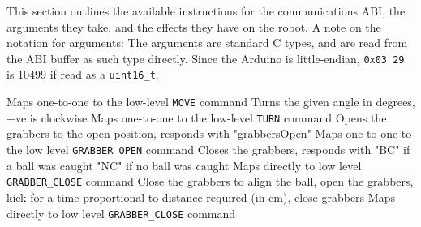 This section outlines the available instructions for the communications ABI, the arguments they take, and the effects they have on the robot.
A note on the notation for arguments: The arguments are standard C types, and are read from the ABI buffer as such type directly. 
Since the Arduino is little-endian, \texttt{0x03 29} is 10499 if read as a \texttt{uint16\_t}.

    {Maps one-to-one to the low-level \texttt{MOVE} command}
    {Turns the given angle in degrees, +ve is clockwise}
    {Maps one-to-one to the low-level \texttt{TURN} command}
    {Opens the grabbers to the open position, responds with "grabbersOpen"}
    {Maps one-to-one to the low level \texttt{GRABBER\_OPEN} command}
    {Closes the grabbers, responds with "BC" if a ball was caught "NC" if no ball was caught}
    {Maps directly to low level \texttt{GRABBER\_CLOSE} command}
    {Close the grabbers to align the ball, open the grabbers, kick for a time proportional to distance required (in cm), close grabbers}
    {Maps directly to low level \texttt{GRABBER\_CLOSE} command}
